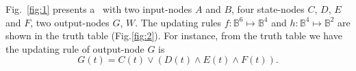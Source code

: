 \begin{example}
Fig.~\ref{fig:1} presents a \BCN\ with two input-nodes $A$ and $B$, four state-nodes $C$, $D$, $E$ and $F$, two output-nodes $G$, $W$. 
%
The updating rules $f:\mathbb{B}^{6}\mapsto \mathbb{B}^4$ and $h:\mathbb{B}^4\mapsto \mathbb{B}^2$ are shown in the truth table (Fig.\ref{fig:2}).  
For instance, from the truth table we have the updating rule of output-node $G$ is 
\[G(t)=C(t)\vee {({D}(t)\wedge { E}(t)\wedge {F}(t))}.\]

  \begin{figure}[thpb]
      \centering
      

\end{figure}
\end{example}
